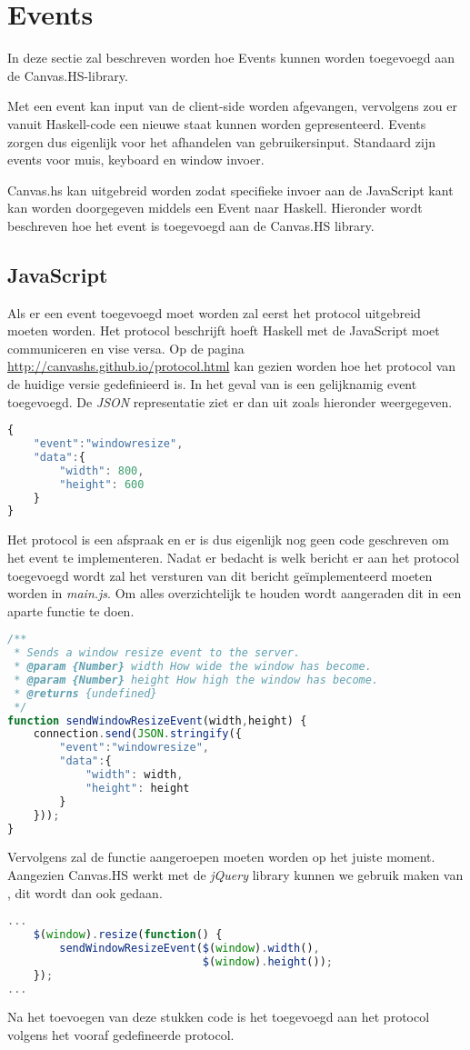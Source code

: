 \section{Events}
In deze sectie zal beschreven worden hoe Events kunnen worden toegevoegd aan de Canvas.HS-library.

Met een event kan input van de client-side worden afgevangen, vervolgens zou er vanuit Haskell-code een nieuwe staat kunnen worden gepresenteerd. Events zorgen dus eigenlijk voor het afhandelen van gebruikersinput. Standaard zijn events voor muis, keyboard en window invoer.

Canvas.hs kan uitgebreid worden zodat specifieke invoer aan de JavaScript kant kan worden doorgegeven middels een Event naar Haskell. Hieronder wordt beschreven hoe het  event is toegevoegd aan de Canvas.HS library.
\subsection{JavaScript}
Als er een event toegevoegd moet worden zal eerst het protocol uitgebreid moeten worden. Het protocol beschrijft hoeft Haskell met de JavaScript moet communiceren en vise versa. Op de pagina \url{http://canvashs.github.io/protocol.html} kan gezien worden hoe het protocol van de huidige versie gedefinieerd is. In het geval van  is een gelijknamig event toegevoegd. De \emph{JSON} representatie ziet er dan uit zoals hieronder weergegeven.
\begin{lstlisting}[language=JavaScript]
{
    "event":"windowresize",
    "data":{
        "width": 800,
        "height": 600
    }
}
\end{lstlisting}
Het protocol is een afspraak en er is dus eigenlijk nog geen code geschreven om het event te implementeren. Nadat er bedacht is welk bericht er aan het protocol toegevoegd wordt zal het versturen van dit bericht ge\"implementeerd moeten worden in \emph{main.js}. Om alles overzichtelijk te houden wordt aangeraden dit in een aparte functie te doen.
\begin{lstlisting}[language=JavaScript]
/**
 * Sends a window resize event to the server.
 * @param {Number} width How wide the window has become.
 * @param {Number} height How high the window has become.
 * @returns {undefined}
 */
function sendWindowResizeEvent(width,height) {
    connection.send(JSON.stringify({
        "event":"windowresize",
        "data":{
            "width": width,
            "height": height
        }
    }));
}
\end{lstlisting}
Vervolgens zal de functie  aangeroepen moeten worden op het juiste moment. Aangezien Canvas.HS werkt met de \emph{jQuery} library kunnen we gebruik maken van , dit wordt dan ook gedaan.
\begin{lstlisting}[language=JavaScript]
...
    $(window).resize(function() {
        sendWindowResizeEvent($(window).width(),
        					  $(window).height());
    });
...
\end{lstlisting}
Na het toevoegen van deze stukken code is het  toegevoegd aan het protocol volgens het vooraf gedefineerde protocol.
